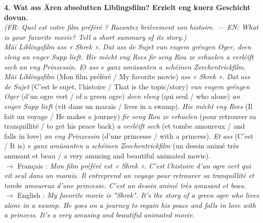 \noindent\textbf{4. Wat ass Ären absolutten Liblingsfilm? Erzielt eng kuerz Geschicht dovun.}\\
\textit{(FR: Quel est votre film préféré ? Racontez brièvement son histoire. — EN: What is your favorite movie? Tell a short summary of its story.)}\\[0.3em]
\textit{Mäi Liblingsfilm ass « Shrek ». Dat ass de Sujet vun engem gréngen Oger, deen eleng an enger Supp lieft. Hie mécht eng Rees fir seng Rou ze erhuelen a verléift sech an eng Prinzessin. Et ass e ganz amüsanten a schéinen Zeechentrickfilm.}\\
\textit{Mäi Liblingsfilm} (Mon film préféré / My favorite movie) \textit{ass « Shrek »}. \textit{Dat ass de Sujet} (C'est le sujet, l'histoire / That is the topic/story) \textit{vun engem gréngen Oger} (d'un ogre vert / of a green ogre) \textit{deen eleng} (qui seul / who alone) \textit{an enger Supp lieft} (vit dans un marais / lives in a swamp). \textit{Hie mécht eng Rees} (Il fait un voyage / He makes a journey) \textit{fir seng Rou ze erhuelen} (pour retrouver sa tranquillité / to get his peace back) \textit{a verléift sech} (et tombe amoureux / and falls in love) \textit{an eng Prinzessin} (d'une princesse / with a princess). \textit{Et ass} (C'est / It is) \textit{e ganz amüsanten a schéinen Zeechentrickfilm} (un dessin animé très amusant et beau / a very amusing and beautiful animated movie).\\
$\rightarrow$ Français : \textit{Mon film préféré est « Shrek ». C'est l'histoire d'un ogre vert qui vit seul dans un marais. Il entreprend un voyage pour retrouver sa tranquillité et tombe amoureux d'une princesse. C'est un dessin animé très amusant et beau.}\\
$\rightarrow$ English : \textit{My favorite movie is "Shrek". It's the story of a green ogre who lives alone in a swamp. He goes on a journey to regain his peace and falls in love with a princess. It's a very amusing and beautiful animated movie.}\\[0.8em]

